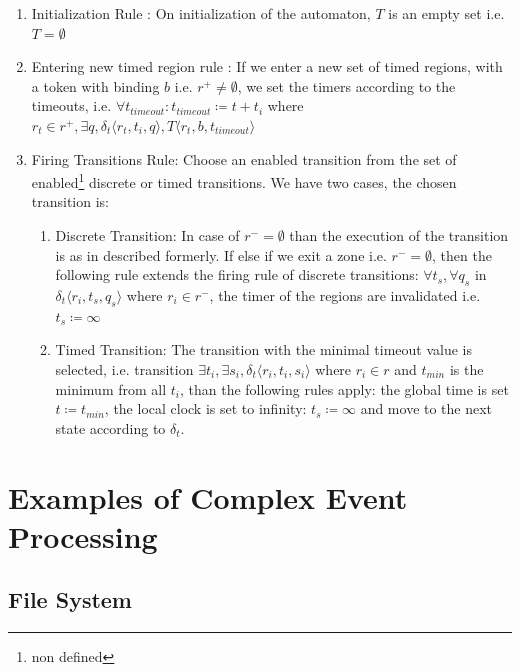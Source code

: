 				\begin{enumerate}
					\item Initialization Rule : On initialization of the automaton, $T$ is an empty set
					i.e. $T = \emptyset$
				
					\item Entering new timed region rule :
					If we enter a new set of timed regions, with a token with binding $b$ 
					i.e. $r^+ \neq \emptyset$, 
					we set the timers according to the timeouts, 
					i.e. $\forall t_{timeout} : t_{timeout} \coloneqq t + t_i $ where $ r_t \in r^+, \exists q ,\delta_t\langle  r_t,t_i,q \rangle, T \langle r_t,b, t_{timeout} \rangle$
					
					\item Firing Transitions Rule: Choose an enabled transition from the set of enabled\footnote{non defined} discrete or timed transitions. 
					We have two cases, the chosen transition is:
						\begin{enumerate}
							\item Discrete Transition: In case of $r^- = \emptyset$ than the execution of the transition is as in described formerly. 
								If else if we exit a zone i.e. $r^- = \emptyset$, 
								then the following rule extends the firing rule of discrete transitions:
								$\forall t_s, \forall q_s$ in $ \delta_t \langle r_i, t_s, q_s \rangle$ where $r_i \in r^-$, the timer of the regions are invalidated i.e.
								$t_s \coloneqq \infty$
							\item Timed Transition: The transition with the minimal timeout value is selected, 
								 i.e. transition $\exists t_i, \exists s_i, \delta_t \langle r_i, t_i, s_i \rangle$ where $ r_i \in r$ and $t_{min}$ is the minimum from all $t_i$,
								 than the following rules apply:
								 the global time is set $t \coloneqq t_{min}$, 
								 the local clock is set to infinity: $t_s \coloneqq \infty$ 
								 and move to the next state according to $\delta_t$.
						\end{enumerate}			
				\end{enumerate}

			
	\section{Examples of Complex Event Processing}
 
 
		\subsection{File System}
